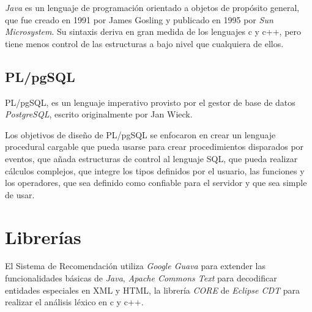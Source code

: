 \textit{Java} es un lenguaje de programación orientado a objetos de propósito general,
que fue creado en 1991 por James Gosling y publicado en 1995 por \textit{Sun Microsystem}.
Su sintaxis deriva en gran medida de los lenguajes c y c++,
pero tiene menos control de las estructuras a bajo nivel que cualquiera de ellos.


\subsection{PL/pgSQL}

\ac{PL/pgSQL},
es un lenguaje imperativo provisto por el gestor de base de datos \textit{PostgreSQL},
escrito originalmente por Jan Wieck.

Los objetivos de diseño de \ac{PL/pgSQL} se enfocaron en crear un lenguaje procedural
cargable que pueda usarse para crear procedimientos disparados por eventos,
que añada estructuras de control al lenguaje \ac{SQL}, que pueda realizar cálculos complejos,
que integre los tipos definidos por el usuario, las funciones y los operadores,
que sea definido como confiable para el servidor y que sea simple de usar.


\section{Librerías}
\label{sec:libs}

El Sistema de Recomendación utiliza
\textit{Google Guava} para extender las funcionalidades básicas de \textit{Java},
\textit{Apache Commons Text} para decodificar entidades especiales en \ac{XML} y \ac{HTML},
la librería \textit{CORE} de \textit{Eclipse CDT} para realizar el análisis léxico en c y c++.

